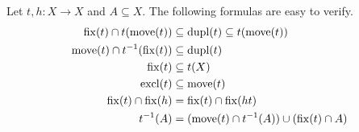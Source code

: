 Let $t,h \colon X \to X$ and $A \subseteq X$. The following formulas are easy to verify. 
\begingroup
\allowdisplaybreaks 
\begin{align}
	\fix{t} \cap t(\move{t})  & \subseteq \dupl{t} \subseteq t(\move{t})  \label{prelim:eqn:fixmovedupl} \\
	\move{t} \cap t^{-1}(\fix{t}) & \subseteq \dupl{t} \label{prelim:eqn:fixmovedupl2} \\
	\fix{t} & \subseteq t(X)  \label{prelim:eqn:fiximage}	\\	
	\excl{t} & \subseteq \move{t} \label{prelim:eqn:exclmove} \\
	\fix{t} \cap \fix{h} & = \fix{t} \cap \fix{\concat{t}{h}} \label{prelim:trans:eqn:fix-comp} \\
	t^{-1}(A)  & =  ( \move{t} \cap t^{-1}(A) ) \cup ( \fix{t} \cap A )  \label{prelim:prop:compinvAt} 
\end{align}
\endgroup%
%
